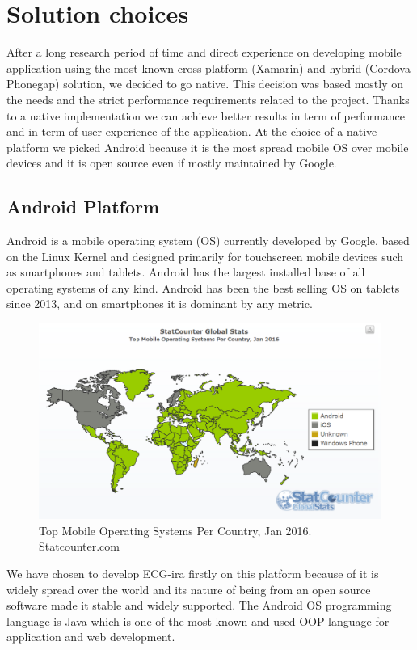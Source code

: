 
\chapter{Solution choices}
\label{Chapter7}

After a long research period of time and direct experience on developing mobile application using the most known cross-platform (Xamarin) and hybrid (Cordova Phonegap) solution, we decided to go native. This decision was based mostly on the needs and the strict performance requirements related to the project. Thanks to a native implementation we can achieve better results in term of performance and in term of user experience of the application. At the choice of a native platform we picked  Android because it is the most spread mobile OS over mobile devices and it is open source even if mostly maintained by Google.

\section{Android Platform}
Android is a mobile operating system (OS) currently developed by Google, based on the Linux Kernel and designed primarily for touchscreen mobile devices such as smartphones and tablets. Android has the largest installed base of all operating systems of any kind. Android has been the best selling OS on tablets since 2013, and on smartphones it is dominant by any metric.\cite{ref18}
\begin{figure}[ht!]
	\centering
	\includegraphics[width=120mm]{figures/ch7/1.png}
	\caption{Top Mobile Operating Systems Per Country, Jan 2016. Statcounter.com}
	\label{fig7.1}
\end{figure}
We have chosen to develop ECG-ira firstly on this platform because of it is widely spread over the world and its nature of being from an open source software made it stable and widely supported. The Android OS programming language is Java which is one of the most known and used OOP language for application and web development.

